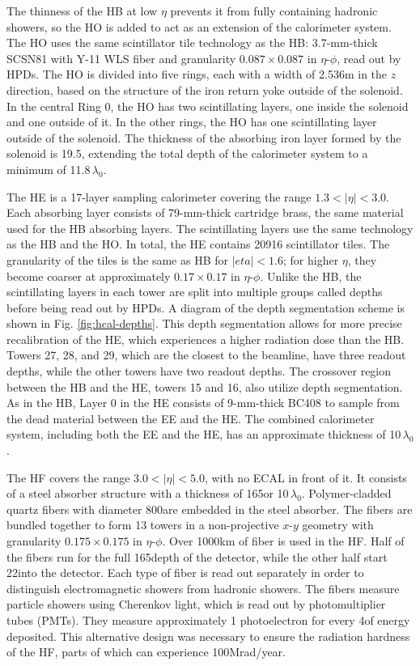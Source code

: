 \documentclass[12pt]{thesis}  %
\begin{document}
The thinness of the HB at low $\eta$ prevents it from fully containing hadronic showers, so the HO is added to act as an extension of the calorimeter system. The HO uses the same scintillator tile technology as the HB: 3.7-mm-thick SCSN81 with Y-11 WLS fiber and granularity $0.087\times0.087$ in $\eta$-$\phi$, read out by HPDs. The HO is divided into five rings, each with a width of 2.536\unit{m} in the $z$ direction, based on the structure of the iron return yoke outside of the solenoid. In the central Ring 0, the HO has two scintillating layers, one inside the solenoid and one outside of it. In the other rings, the HO has one scintillating layer outside of the solenoid. The thickness of the absorbing iron layer formed by the solenoid is 19.5\cm, extending the total depth of the calorimeter system to a minimum of 11.8$\,\lambda_{0}$.

The HE is a 17-layer sampling calorimeter covering the range $1.3<|\eta|<3.0$. Each absorbing layer consists of 79-mm-thick cartridge brass, the same material used for the HB absorbing layers. The scintillating layers use the same technology as the HB and the HO. In total, the HE contains 20916 scintillator tiles. The granularity of the tiles is the same as HB for $|eta|<1.6$; for higher $\eta$, they become coarser at approximately $0.17\times0.17$ in $\eta$-$\phi$. Unlike the HB, the scintillating layers in each tower are split into multiple groups called depths before being read out by HPDs. A diagram of the depth segmentation scheme is shown in Fig. \ref{fig:hcal-depths}. This depth segmentation allows for more precise recalibration of the HE, which experiences a higher radiation dose than the HB. Towers 27, 28, and 29, which are the closest to the beamline, have three readout depths, while the other towers have two readout depths. The crossover region between the HB and the HE, towers 15 and 16, also utilize depth segmentation. As in the HB, Layer 0 in the HE consists of 9-mm-thick BC408 to sample from the dead material between the EE and the HE. The combined calorimeter system, including both the EE and the HE, has an approximate thickness of 10$\,\lambda_{0}$.

The HF covers the range $3.0<|\eta|<5.0$, with no ECAL in front of it. It consists of a steel absorber structure with a thickness of 165\cm or 10$\,\lambda_{0}$. Polymer-cladded quartz fibers with diameter 800\mum are embedded in the steel absorber. The fibers are bundled together to form 13 towers in a non-projective $x$-$y$ geometry with granularity $0.175\times0.175$ in $\eta$-$\phi$. Over 1000\unit{km} of fiber is used in the HF. Half of the fibers run for the full 165\cm depth of the detector, while the other half start 22\cm into the detector. Each type of fiber is read out separately in order to distinguish electromagnetic showers from hadronic showers. The fibers measure particle showers using Cherenkov light, which is read out by photomultiplier tubes (PMTs). They measure approximately 1 photoelectron for every 4\GeV of energy deposited. This alternative design was necessary to ensure the radiation hardness of the HF, parts of which can experience 100\unit{Mrad/year}.
\end{document}
